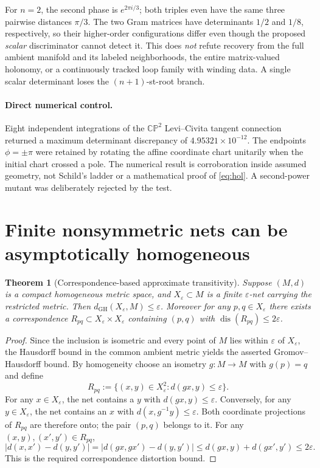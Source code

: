 \documentclass[11pt,a4paper]{article}
\newtheorem{theorem}{Theorem}
\newcommand{\CP}{\mathbb{CP}}
\newcommand{\GH}{\mathrm{GH}}
\newcommand{\dist}{\operatorname{dis}}
\begin{document}
For $n=2$, the second phase is $e^{2\pi i/3}$; both triples even have the same three pairwise distances $\pi/3$. The two Gram matrices have determinants $1/2$ and $1/8$, respectively, so their higher-order configurations differ even though the proposed \emph{scalar} discriminator cannot detect it. This does \emph{not} refute recovery from the full ambient manifold and its labeled neighborhoods, the entire matrix-valued holonomy, or a continuously tracked loop family with winding data. A single scalar determinant loses the $(n+1)$-st-root branch.

\paragraph{Direct numerical control.} Eight independent integrations of the $\CP^2$ Levi--Civita tangent connection returned a maximum determinant discrepancy of $4.95321\times10^{-12}$. The endpoints $\phi=\pm\pi$ were retained by rotating the affine coordinate chart unitarily when the initial chart crossed a pole. The numerical result is corroboration inside assumed geometry, not Schild's ladder or a mathematical proof of \eqref{eq:hol}. A second-power mutant was deliberately rejected by the test.

\section{Finite nonsymmetric nets can be asymptotically homogeneous}
\begin{theorem}[Correspondence-based approximate transitivity]\label{thm:net}
Suppose $(M,d)$ is a compact homogeneous metric space, and $X_\varepsilon\subset M$ is a finite $\varepsilon$-net carrying the restricted metric. Then $d_{\GH}(X_\varepsilon,M)\le\varepsilon$. Moreover for any $p,q\in X_\varepsilon$ there exists a correspondence $R_{pq}\subset X_\varepsilon\times X_\varepsilon$ containing $(p,q)$ with $\dist(R_{pq})\le2\varepsilon$.
\end{theorem}
\begin{proof}
Since the inclusion is isometric and every point of $M$ lies within $\varepsilon$ of $X_\varepsilon$, the Hausdorff bound in the common ambient metric yields the asserted Gromov--Hausdorff bound. By homogeneity choose an isometry $g:M\to M$ with $g(p)=q$ and define
\[
R_{pq}:=\{(x,y)\in X_\varepsilon^2: d(gx,y)\le\varepsilon\}.
\]
For any $x\in X_\varepsilon$, the net contains a $y$ with $d(gx,y)\le\varepsilon$. Conversely, for any $y\in X_\varepsilon$, the net contains an $x$ with $d(x,g^{-1}y)\le\varepsilon$. Both coordinate projections of $R_{pq}$ are therefore onto; the pair $(p,q)$ belongs to it. For any $(x,y),(x',y')\in R_{pq}$,
\[
|d(x,x')-d(y,y')|=|d(gx,gx')-d(y,y')|
\le d(gx,y)+d(gx',y')\le2\varepsilon.
\]
This is the required correspondence distortion bound.
\end{proof}
\end{document}
